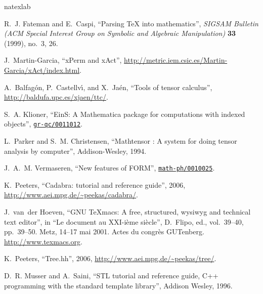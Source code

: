 \documentclass{elsart}
\begin{document}
\setlength{\bibsep}{4pt}
%
%
\begingroup\raggedright\begin{thebibliography}{23}
\expandafter\ifx\csname natexlab\endcsname\relax\def\natexlab#1{#1}\fi

R.~J. Fateman and E.~Caspi, ``Parsing {{\TeX}} into mathematics'', {\em SIGSAM
  Bulletin (ACM Special Interest Group on Symbolic and Algebraic Manipulation)}
  {\bf 33} (1999), no.~3, 26.

J.~Martin-Garcia, ``{xPerm and xAct}'',
  \url{http://metric.iem.csic.es/Martin-Garcia/xAct/index.html}.

A.~{Balfag\'on}, P.~{Castellv\'\i}, and X.~{Ja\'en}, ``Tools of tensor
  calculus'', \url{http://baldufa.upc.es/xjaen/ttc/}.

S.~A. Klioner, ``{EinS: A Mathematica package for computations with indexed
  objects}'',
\href{http://xxx.lanl.gov/abs/gr-qc/0011012}{{\tt gr-qc/0011012}}.

L.~Parker and S.~M. Christensen, ``Mathtensor : A system for doing tensor
  analysis by computer'', Addison-Wesley, 1994.

J.~A.~M. Vermaseren, ``New features of {FORM}'',
\href{http://xxx.lanl.gov/abs/math-ph/0010025}{{\tt math-ph/0010025}}.

K.~Peeters, ``Cadabra: tutorial and reference guide'', 2006,
  \url{http://www.aei.mpg.de/~peekas/cadabra/}.

J.~van~der Hoeven, ``{GNU TeXmacs: A free, structured, wysiwyg and technical
  text editor}'', in ``Le document au XXI-i\`eme si\`ecle'', D.~Flipo, ed.,
  vol.~39--40, pp.~39--50.
\newblock Metz, 14--17 mai 2001.
\newblock Actes du congr\`es GUTenberg. \url{http://www.texmacs.org}.

K.~Peeters, ``Tree.hh'', 2006, \url{http://www.aei.mpg.de/~peekas/tree/}.

D.~R. Musser and A.~Saini, ``{STL} tutorial and reference guide, {C++}
  programming with the standard template library'', Addison Wesley, 1996.


\end{thebibliography}
\end{document}
